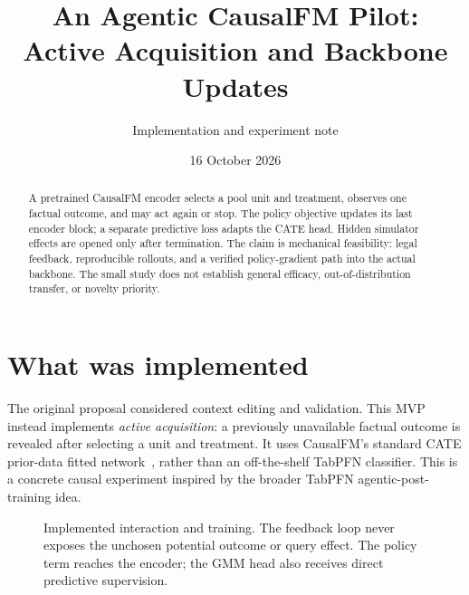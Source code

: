 \documentclass[10pt,a4paper]{article}
\title{An Agentic CausalFM Pilot:\\Active Acquisition and Backbone Updates}
\author{Implementation and experiment note}
\date{16 October 2026}
\begin{document}
\maketitle
\vspace{-1.7em}
\begin{abstract}
\noindent A pretrained CausalFM encoder selects a pool unit and treatment,
observes one factual outcome, and may act again or stop. The policy objective
updates its last encoder block; a separate predictive loss adapts the CATE
head. Hidden simulator effects are opened only after termination. The claim
is mechanical feasibility: legal feedback, reproducible rollouts, and a
verified policy-gradient path into the actual backbone. The small study does
not establish general efficacy, out-of-distribution transfer, or novelty priority.
\end{abstract}

\section{What was implemented}
The original proposal considered context editing and validation. This MVP
instead implements \emph{active acquisition}: a previously unavailable factual
outcome is revealed after selecting a unit and treatment. It uses CausalFM's
standard CATE prior-data fitted network~\cite{causalfm}, rather than an
off-the-shelf TabPFN classifier. This is a concrete causal experiment inspired
by the broader TabPFN agentic-post-training idea.

\begin{figure}[h]
\centering
{}
\caption{Implemented interaction and training. The feedback loop never exposes
the unchosen potential outcome or query effect. The policy term reaches the
encoder; the GMM head also receives direct predictive supervision.}
\end{figure}
\end{document}
